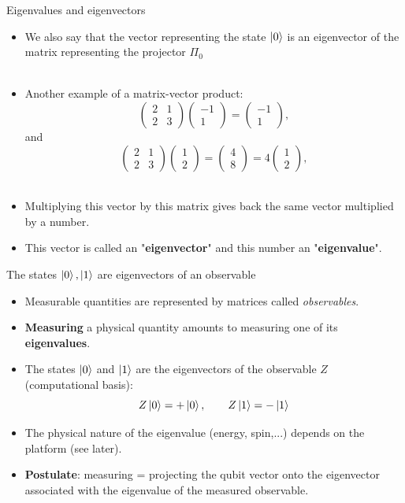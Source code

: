 \documentclass[aspectratio=169,12pt]{beamer}
\begin{document}
\begin{frame}{Eigenvalues and eigenvectors}
  \begin{itemize}[<+->]
    \setlength{\itemsep}{0.6em}
    \item We also say that the vector representing the state $\ket 0$ is an eigenvector of the matrix representing the projector $\Pi_0^{}$\\~\\
    \item Another example of a matrix-vector product:   
    $$ \begin{pmatrix} 2 & 1 \\ 2 & 3 \end{pmatrix} \begin{pmatrix} -1 \\ 1 \end{pmatrix} = \begin{pmatrix} -1 \\ 1 \end{pmatrix},$$
    and 
    $$ \begin{pmatrix} 2 & 1 \\ 2 & 3 \end{pmatrix} \begin{pmatrix} 1 \\ 2 \end{pmatrix} = \begin{pmatrix} 4 \\ 8 \end{pmatrix} = 4 \begin{pmatrix} 1 \\ 2 \end{pmatrix},$$~\\
    \item Multiplying this vector by this matrix gives back the same vector multiplied by a number.
    \item This vector is called an "\textbf{eigenvector}" and this number an "\textbf{eigenvalue}".
  \end{itemize}
\end{frame}

\begin{frame}{The states $\ket 0, \ket 1$ are eigenvectors of an observable}
  \begin{itemize}[<+->]
    \setlength{\itemsep}{0.6em}
    \item Measurable quantities are represented by matrices called \textit{observables}.
    \item \textbf{Measuring} a physical quantity amounts to measuring one of its \textbf{eigenvalues}.
    \item The states $\ket{0}$ and $\ket{1}$ are the eigenvectors of the observable $Z$
     (computational basis):
    $$Z\ket{0} = +\ket{0}, \qquad Z\ket{1} = -\ket{1}$$
    \item The physical nature of the eigenvalue (energy, spin,...) depends on the platform (see later).
    \item \textbf{Postulate}: measuring = projecting the qubit vector onto the eigenvector associated with the
     eigenvalue of the measured observable.
  \end{itemize}
\end{frame}
\end{document}
